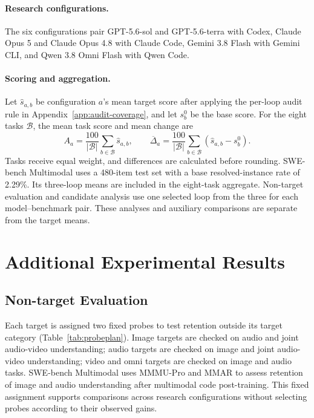 \paragraph{Research configurations.}
The six configurations pair GPT-5.6-sol and GPT-5.6-terra with Codex, Claude Opus 5 and Claude Opus 4.8 with Claude Code, Gemini 3.8 Flash with Gemini CLI, and Qwen 3.8 Omni Flash with Qwen Code.

\paragraph{Scoring and aggregation.}
Let $\widehat{s}_{a,b}$ be configuration $a$'s mean target score after applying the per-loop audit rule in Appendix~\ref{app:audit-coverage}, and let $s_b^0$ be the base score. For the eight tasks $\mathcal B$, the mean task score and mean change are
\begin{equation}
A_a=\frac{100}{|\mathcal B|}\sum_{b\in\mathcal B}\widehat{s}_{a,b},
\qquad
\overline{\Delta}_a=\frac{100}{|\mathcal B|}\sum_{b\in\mathcal B}(\widehat{s}_{a,b}-s_b^0).
\label{eq:mean-accuracy-change}
\end{equation}
Tasks receive equal weight, and differences are calculated before rounding. SWE-bench Multimodal uses a 480-item test set with a base resolved-instance rate of 2.29\%. Its three-loop means are included in the eight-task aggregate. Non-target evaluation and candidate analysis use one selected loop from the three for each model--benchmark pair. These analyses and auxiliary comparisons are separate from the target means.

\section{Additional Experimental Results}
\label{app:additional-results}

\subsection{Non-target Evaluation}
\label{app:nontarget-matrix}
Each target is assigned two fixed probes to test retention outside its target category (Table~\ref{tab:probeplan}). Image targets are checked on audio and joint audio-video understanding; audio targets are checked on image and joint audio-video understanding; video and omni targets are checked on image and audio tasks. SWE-bench Multimodal uses MMMU-Pro and MMAR to assess retention of image and audio understanding after multimodal code post-training. This fixed assignment supports comparisons across research configurations without selecting probes according to their observed gains.

